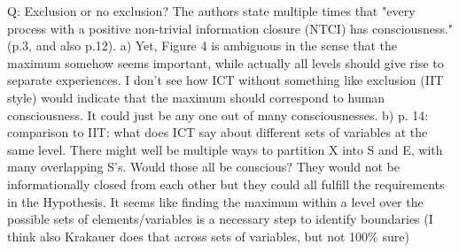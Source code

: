 \documentclass[utf8]{article}
\newcounter{cQuestion}[section]
\newenvironment{question}
    {\refstepcounter{cQuestion}\color{Blue}\noindent\newline Q\thecQuestion:}
    {~\newline}
\begin{document}
        \begin{question}
            Exclusion or no exclusion? The authors state multiple times that "every process with a positive non-trivial information closure (NTCI) has consciousness." (p.3, and also p.12).
            a) Yet, Figure 4 is ambiguous in the sense that the maximum somehow seems important, while actually all levels should give rise to separate experiences. I don't see how ICT without something like exclusion (IIT style) would indicate that the maximum should correspond to human consciousness. It could just be any one out of many consciousnesses.
            b) p. 14: comparison to IIT: what does ICT say about different sets of variables at the same level. There might well be multiple ways to partition X into S and E, with many overlapping S's. Would those all be conscious? They would not be informationally closed from each other but they could all fulfill the requirements in the Hypothesis. It seems like finding the maximum within a level over the possible sets of elements/variables is a necessary step to identify boundaries (I think also Krakauer does that across sets of variables, but not 100\% sure)        
        \end{question}
    
\end{document}
